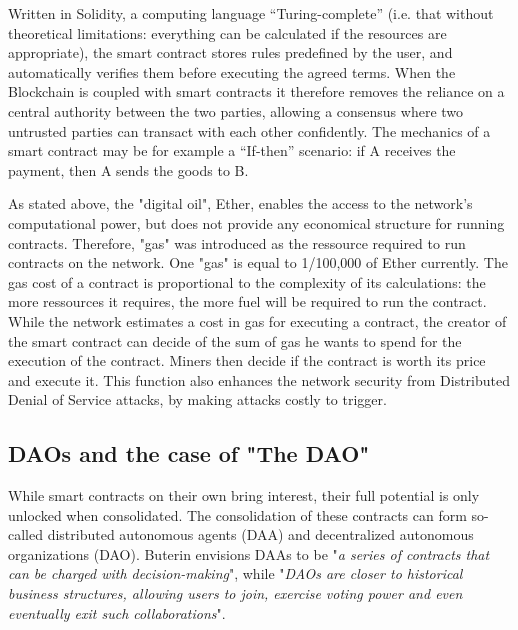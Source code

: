 \documentclass[11pt]{report}
\begin{document}
Written in Solidity, a computing language “Turing-complete” (i.e. that without theoretical limitations: everything can be calculated if the resources are appropriate), the smart contract stores rules predefined by the user, and automatically verifies them before executing the agreed terms. When the Blockchain is coupled with smart contracts it therefore removes the reliance on a central authority between the two parties, allowing a consensus where two untrusted parties can transact with each other confidently. The mechanics of a smart contract may be for example a “If-then” scenario: if A receives the payment, then A sends the goods to B. \medbreak

As stated above, the "digital oil", Ether, enables the access to the network's computational power, but does not provide any economical structure for running contracts. Therefore, "gas" was introduced as the ressource required to run contracts on the network. One "gas" is equal to 1/100,000 of Ether currently. The gas cost of a contract is proportional to the complexity of its calculations: the more ressources it requires, the more fuel will be required to run the contract. \newline 
While the network estimates a cost in gas for executing a contract, the creator of the smart contract can decide of the sum of gas he wants to spend for the execution of the contract. Miners then decide if the contract is worth its price and execute it. This function also enhances the network security from Distributed Denial of Service attacks, by making attacks costly to trigger.
\clearpage
\subsection*{DAOs and the case of "The DAO"}

While smart contracts on their own bring interest, their full potential is only unlocked when consolidated. The consolidation of these contracts can form so-called distributed autonomous agents (DAA) and decentralized autonomous organizations (DAO). Buterin envisions DAAs to be "\textit{a series of contracts that can be charged with decision-making}", while "\textit{DAOs are closer to historical business structures, allowing users to join, exercise voting power and even eventually exit such collaborations}".\cite{COINDESK}
\end{document}
